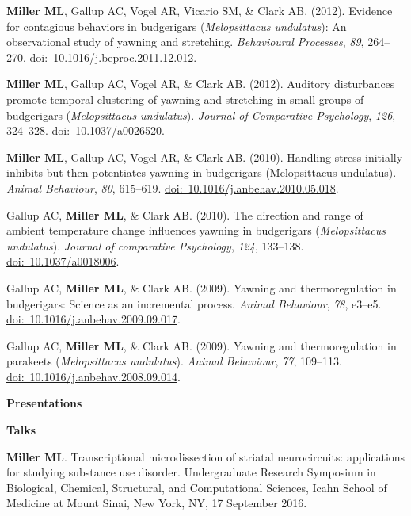 \documentclass[10pt]{article}
\begin{document}
\begin{description}
\item \textbf{Miller ML}, Gallup AC, Vogel AR, Vicario SM, \& Clark AB. (2012). Evidence for contagious behaviors in budgerigars (\textit{Melopsittacus undulatus}): An observational study of yawning and stretching. \textit{Behavioural Processes}, \textit{89}, 264--270. \href{https://doi.org/10.1016/j.beproc.2011.12.012}{doi:~10.1016/j.beproc.2011.12.012}.
\item \textbf{Miller ML}, Gallup AC, Vogel AR, \& Clark AB. (2012). Auditory disturbances promote temporal clustering of yawning and stretching in small groups of budgerigars (\textit{Melopsittacus undulatus}). \textit{Journal of Comparative Psychology}, \textit{126}, 324--328. \href{https://doi.org/10.1037/a0026520}{doi:~10.1037/a0026520}.
\item \textbf{Miller ML}, Gallup AC, Vogel AR, \& Clark AB. (2010). Handling-stress initially inhibits but then potentiates yawning in budgerigars (Melopsittacus undulatus). \textit{Animal Behaviour}, \textit{80}, 615--619. \href{https://doi.org/10.1016/j.anbehav.2010.05.018}{doi:~10.1016/j.anbehav.2010.05.018}.
\item Gallup AC, \textbf{Miller ML}, \& Clark AB. (2010). The direction and range of ambient temperature change influences yawning in budgerigars (\textit{Melopsittacus undulatus}). \textit{Journal of comparative Psychology}, \textit{124}, 133--138. \href{https://doi.org/10.1037/a0018006}{doi:~10.1037/a0018006}.
\item Gallup AC, \textbf{Miller ML}, \& Clark AB. (2009). Yawning and thermoregulation in budgerigars: Science as an incremental process. \textit{Animal Behaviour}, \textit{78}, e3--e5. \href{https://doi.org/10.1016/j.anbehav.2009.09.017}{doi:~10.1016/j.anbehav.2009.09.017}.
\item Gallup AC, \textbf{Miller ML}, \& Clark AB. (2009). Yawning and thermoregulation in parakeets (\textit{Melopsittacus undulatus}). \textit{Animal Behaviour}, \textit{77}, 109--113. \href{https://doi.org/10.1016/j.anbehav.2008.09.014}{doi:~10.1016/j.anbehav.2008.09.014}.
\end{description}

\vspace{0.1in}

{\large \textbf{Presentations}}
\begin{description}
\item \textbf{Talks}
\item[\quad] \textbf{Miller ML}. Transcriptional microdissection of striatal neurocircuits: applications for studying substance use disorder. Undergraduate Research Symposium in Biological, Chemical, Structural, and Computational Sciences, Icahn School of Medicine at Mount Sinai, New York, NY, 17 September 2016.
\end{description}
\end{document}
